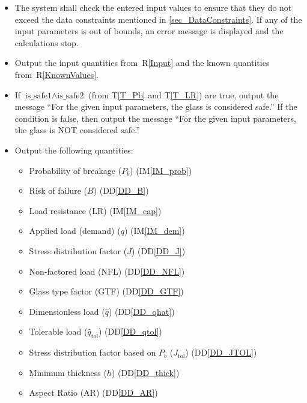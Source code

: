 \documentclass[12pt]{article}
\newcommand{\ddref}[1]{DD\ref{#1}}
\newcommand{\tref}[1]{T\ref{#1}}
\newcommand{\iref}[1]{IM\ref{#1}}
\newcounter{reqnum} %
\newcommand{\rref}[1]{R\ref{#1}}
\begin{document}
\begin{itemize}
\item[R\refstepcounter{reqnum}\thereqnum \label{Verify}:]

  The system shall check the entered input values to ensure that they do not
  exceed the data constraints mentioned in \ref{sec_DataConstraints}.  If any of
  the input parameters is out of bounds, an error message is displayed and the
  calculations stop.

\item[R\refstepcounter{reqnum}\thereqnum \label{R_OutputInput}:]

  Output the input quantities from~\rref{Input} and the known quantities
  from~\rref{KnownValues}.


\item[R\refstepcounter{reqnum}\thereqnum \label{R_ Comparison}:] If
  $\text{is\_safe1} \wedge \text{is\_safe2}$ (from \tref{T_Pb} and \tref{T_LR}) are true,
  output the message ``For the given input parameters, the glass is considered
  safe.''  If the condition is false, then output the message ``For the given
  input parameters, the glass is NOT considered safe.''

\item[R\refstepcounter{reqnum}\thereqnum \label{R_Output}:]
  Output the following quantities:
\begin{itemize}
\item Probability of breakage ($P_b$) (\iref{IM_prob})
\item Risk of failure ($B$) (\ddref{DD_B})
\item Load resistance (LR) (\iref{IM_cap})
\item Applied load (demand) ($q$) (\iref{IM_dem})
\item Stress distribution factor ($J$) (\ddref{DD_J})
\item Non-factored load (NFL) (\ddref{DD_NFL})
\item Glass type factor (GTF) (\ddref{DD_GTF})
\item Dimensionless load ($\hat{q}$) (\ddref{DD_qhat})
\item Tolerable load ($\hat{q}_{\text{tol}}$) (\ddref{DD_qtol})
\item Stress distribution factor based on $P_b$ ($J_{\text{tol}}$) (\ddref{DD_JTOL})
\item Minimum thickness ($h$) (\ddref{DD_thick})
\item Aspect Ratio (AR) (\ddref{DD_AR})
\end{itemize}

\end{itemize}
\end{document}
